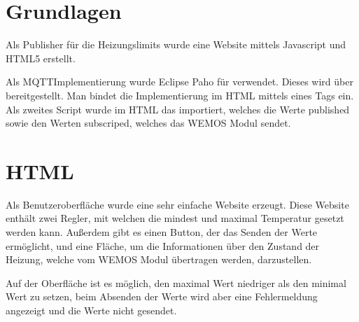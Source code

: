\documentclass[a4paper,11pt,openany,oneside,ngerman]{sphinxmanual}
\begin{document}
\section{Grundlagen}
\label{\detokenize{webpage:grundlagen}}
Als Publisher für die Heizungslimits wurde eine Website mittels Javascript und
HTML5 erstellt.

Als MQTT\sphinxhyphen{}Implementierung wurde Eclipse Paho für verwendet. Dieses wird über
bereitgestellt. Man bindet die Implementierung im HTML mittels eines
\sphinxhyphen{}Tags ein. Als zweites Script wurde im HTML das  importiert,
welches die Werte published sowie den Werten subscriped, welches das WEMOS Modul
sendet.


\section{HTML}
\label{\detokenize{webpage:html}}
Als Benutzeroberfläche wurde eine sehr einfache Website erzeugt. Diese Website
enthält zwei Regler, mit welchen die mindest und maximal Temperatur gesetzt
werden kann. Außerdem gibt es einen Button, der das Senden der Werte ermöglicht,
und eine Fläche, um die Informationen über den Zustand der Heizung, welche vom
WEMOS Modul übertragen werden, darzustellen.

Auf der Oberfläche ist es möglich, den maximal Wert niedriger als den minimal
Wert zu setzen, beim Absenden der Werte wird aber eine Fehlermeldung angezeigt
und die Werte nicht gesendet.
\end{document}
